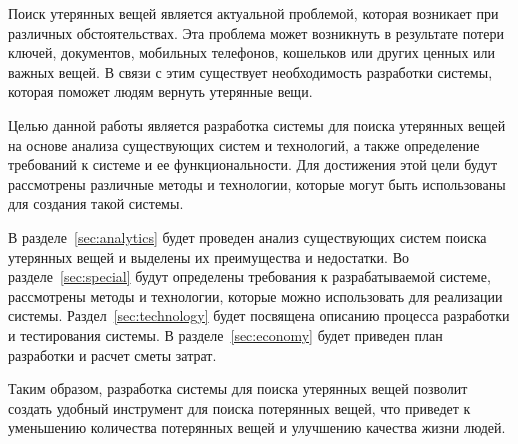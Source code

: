 \label{sec:introduction}

Поиск утерянных вещей является актуальной проблемой, которая возникает при различных обстоятельствах. Эта проблема может возникнуть в результате потери ключей, документов, мобильных телефонов, кошельков или других ценных или важных вещей. В связи с этим существует необходимость разработки системы, которая поможет людям вернуть утерянные вещи.

Целью данной работы является разработка системы для поиска утерянных вещей на основе анализа существующих систем и технологий, а также определение требований к системе и ее функциональности. Для достижения этой цели будут рассмотрены различные методы и технологии, которые могут быть использованы для создания такой системы.

В разделе~\ref{sec:analytics} будет проведен анализ существующих систем поиска утерянных вещей и выделены их преимущества и недостатки. Во разделе~\ref{sec:special} будут определены требования к разрабатываемой системе, рассмотрены методы и технологии, которые можно использовать для реализации системы. Раздел~\ref{sec:technology} будет посвящена описанию процесса разработки и тестирования системы. В разделе~\ref{sec:economy} будет приведен план разработки и расчет сметы затрат.

Таким образом, разработка системы для поиска утерянных вещей позволит создать удобный инструмент для поиска потерянных вещей, что приведет к уменьшению количества потерянных вещей и улучшению качества жизни людей.